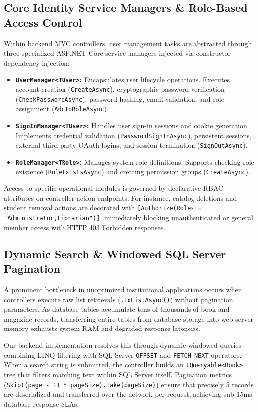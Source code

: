 \documentclass[10pt,journal,compsoc]{IEEEtran}
\begin{document}
\subsection{Core Identity Service Managers \& Role-Based Access Control}
Within backend MVC controllers, user management tasks are abstracted through three specialized ASP.NET Core service managers injected via constructor dependency injection:
\begin{itemize}[leftmargin=1.5em]
    \item \textbf{\texttt{UserManager<TUser>}:} Encapsulates user lifecycle operations. Executes account creation (\texttt{CreateAsync}), cryptographic password verification (\texttt{CheckPasswordAsync}), password hashing, email validation, and role assignment (\texttt{AddToRoleAsync}).
    \item \textbf{\texttt{SignInManager<TUser>}:} Handles user sign-in sessions and cookie generation. Implements credential validation (\texttt{PasswordSignInAsync}), persistent sessions, external third-party OAuth logins, and session termination (\texttt{SignOutAsync}).
    \item \textbf{\texttt{RoleManager<TRole>}:} Manages system role definitions. Supports checking role existence (\texttt{RoleExistsAsync}) and creating permission groups (\texttt{CreateAsync}).
\end{itemize}

Access to specific operational modules is governed by declarative RBAC attributes on controller action endpoints. For instance, catalog deletions and student removal actions are decorated with \texttt{[Authorize(Roles = "Administrator,Librarian")]}, immediately blocking unauthenticated or general member access with HTTP 403 Forbidden responses.

\subsection{Dynamic Search \& Windowed SQL Server Pagination}
A prominent bottleneck in unoptimized institutional applications occurs when controllers execute raw list retrievals (\texttt{.ToListAsync()}) without pagination parameters. As database tables accumulate tens of thousands of book and magazine records, transferring entire tables from database storage into web server memory exhausts system RAM and degraded response latencies.

Our backend implementation resolves this through dynamic windowed queries combining LINQ filtering with SQL Server \texttt{OFFSET} and \texttt{FETCH NEXT} operators. When a search string is submitted, the controller builds an \texttt{IQueryable<Book>} tree that filters matching text within SQL Server itself. Pagination metrics (\texttt{Skip((page - 1) * pageSize).Take(pageSize)}) ensure that precisely 5 records are deserialized and transferred over the network per request, achieving sub-15ms database response SLAs.
\end{document}
